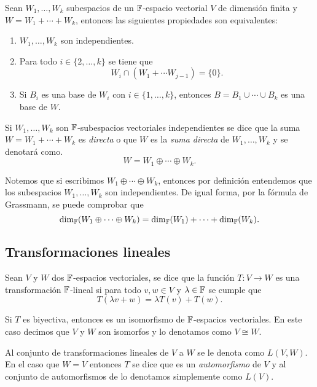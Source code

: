 \begin{teor}
  Sean $W_1, \ldots, W_k$ subespacios de un $\mathbb{F}$-espacio vectorial $V$ de dimensión finita y $W = W_1 + \cdots + W_k$, entonces las siguientes propiedades son equivalentes:
  \begin{enumerate}
    \item $W_1, \ldots, W_k$ son independientes.
    \item Para todo $i \in \{2, \ldots, k\}$ se tiene que
            \[ W_i \cap (W_1 + \cdots W_{j-1})  = \{0\}. \]
    \item Si $B_i$ es una base de $W_i$ con $i \in \{1, \ldots, k\}$, entonces $B = B_1 \cup  \cdots \cup  B_k$ es una base de $W$.
  \end{enumerate}
\end{teor}

\begin{defi}
  Si $W_1, \ldots, W_k$ son $\mathbb{F}$-subespacios vectoriales independientes se dice que la suma $W = W_1 + \cdots + W_k$ es \emph{directa} o que $W$ es la \emph{suma directa} de  $W_1, \ldots, W_k$ y se denotará como.
    \[ W =  W_1 \oplus \cdots \oplus W_k.\]
\end{defi}

Notemos que si escribimos $W_1 \oplus \cdots \oplus W_k$, entonces por definición entendemos que los subespacios $W_1, \ldots, W_k$ son independientes. De igual forma, por la fórmula de Grassmann, se puede comprobar que 
\[ \dim_{\mathbb{F}} (W_1 \oplus \cdots \oplus W_k) = \dim_{\mathbb{F}} (W_1) + \cdots + \dim_{\mathbb{F}} (W_k).\]

\subsection{Transformaciones lineales}

\begin{defi}
  Sean $V$ y $W$ dos $\mathbb{F}$-espacios vectoriales, se dice que la función $T\colon V\to W$ es una transformación $\mathbb{F}$-lineal si para todo $v,w \in V$ y $\lambda \in \mathbb{F}$ se cumple que 
  \[ T(\lambda v + w) = \lambda T(v) + T(w).\]

  Si $T$ es biyectiva, entonces es un isomorfismo de $\mathbb{F}$-espacios vectoriales. En este caso decimos que $V$ y $W$ son isomorfos y lo denotamos como $V \cong W$.
\end{defi}

Al conjunto de transformaciones lineales de $V$ a $W$ se le denota como $L(V,W)$. En el caso que $W = V$ entonces $T$ se dice que es un \emph{automorfismo} de $V$ y al conjunto de automorfismos de lo denotamos simplemente como $L(V)$.


